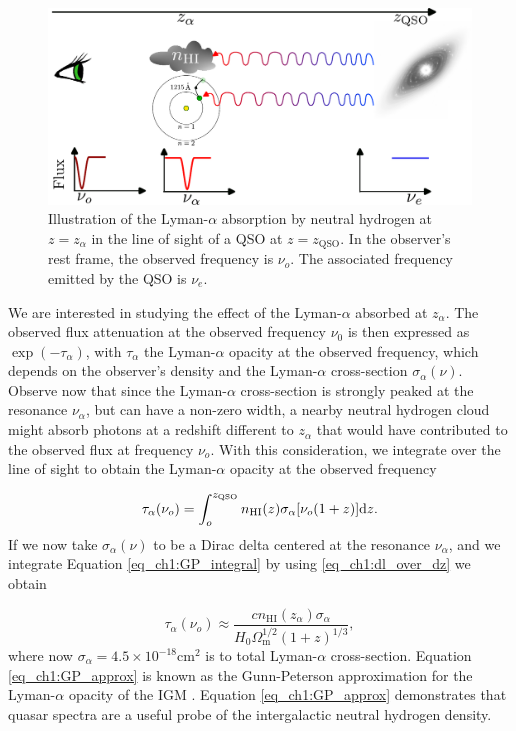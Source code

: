 \begin{figure}[t]
    \centering
    \includegraphics[width=1\linewidth]{img/lyman-alpha.pdf}
    \caption{Illustration of the Lyman-$\alpha$ absorption by neutral hydrogen at $z=z_\alpha$ in the line of sight of a QSO at $z=z_{\text{QSO}}$. In the observer's rest frame, the observed frequency is $\nu_o$. The associated frequency emitted by the QSO is $\nu_e$. }
    \label{fig_ch1:Lyman_alpha_diagram}
\end{figure}
We are interested in studying the effect of the Lyman-$\alpha$ absorbed at $z_\alpha$. The observed flux attenuation at the observed frequency $\nu_0$ is then expressed as $\exp(-\tau_\alpha)$, with $\tau_\alpha$ the Lyman-$\alpha$ opacity at the observed frequency, which depends on the observer's density and the Lyman-$\alpha$ cross-section $\sigma_\alpha(\nu)$. Observe now that since the Lyman-$\alpha$ cross-section is strongly peaked at the resonance $\nu_\alpha$, but can have a non-zero width, a nearby neutral hydrogen cloud might absorb photons at a redshift different to $z_\alpha$ that would have contributed to the observed flux at frequency $\nu_o$. With this consideration, we integrate over the line of sight to obtain the Lyman-$\alpha$ opacity at the observed frequency

\begin{equation}\label{eq_ch1:GP_integral}
    \tau_\alpha(\nu_o)=\int_o^{z_\text{QSO}} n_\text{HI}(z) \sigma_\alpha[\nu_o(1+z)] \differential z.
\end{equation}
If we now take $\sigma_\alpha(\nu)$ to be a Dirac delta centered at the resonance $\nu_\alpha$, and we integrate Equation \ref{eq_ch1:GP_integral} by using \ref{eq_ch1:dl_over_dz} we obtain

\begin{equation}\label{eq_ch1:GP_approx}
    \tau_\alpha(\nu_o)\approx \frac{cn_\text{HI}(z_\alpha)\sigma_\alpha}{H_0\Omega_\text{m}^{1/2} (1+z)^{1/3}},
\end{equation}
where now $\sigma_\alpha=4.5 \times 10^{-18}$cm$^2$ is to total Lyman-$\alpha$ cross-section.
Equation \ref{eq_ch1:GP_approx} is known as the Gunn-Peterson approximation for the Lyman-$\alpha$ opacity of the IGM \cite{GunnPeterson}. Equation \ref{eq_ch1:GP_approx} demonstrates that quasar spectra are a useful probe of the intergalactic neutral hydrogen density.





